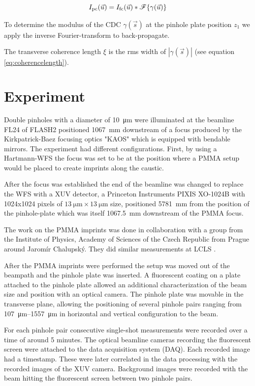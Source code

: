 \documentclass{osa-article}
\begin{document}
\begin{equation}
    I_{\textup{pc}}(\vec{u}) = I_\textup{fc}(\vec{u}) \ast \mathscr{F}\{\gamma(\vec{u})\}    
\end{equation}

To determine the modulus of the CDC $\gamma(\vec{s})$ at the pinhole plate position $z_1$ we apply the inverse Fourier-transform to back-propagate.

The transverse coherence length $\xi$ is the rms width of  $|\gamma(\vec{s})|$ (see equation \ref{eq:coherencelength}).


\section{Experiment}

Double pinholes with a diameter of \SI{10}{\micro\meter} were illuminated at the beamline FL24 of FLASH2 positioned \SI{1067}{mm} downstream of a focus produced by the Kirkpatrick-Baez focusing optics "KAOS" which is equipped with bendable mirrors. The experiment had different configurations. First, by using a Hartmann-WFS the focus was set to be at the position where a PMMA setup would be placed to create imprints along the caustic. 

After the focus was established the end of the beamline was changed to replace the WFS with a XUV detector, a Princeton Instruments PIXIS XO-1024B with 1024x1024 pixels of $\SI{13}{\micro\meter} \times \SI{13}{\micro\meter}$ size, positioned \SI{5781}{mm} from the position of the pinhole-plate which was itself \SI{1067.5}{mm} downstream of the PMMA focus.

The work on the PMMA imprints was done in collaboration with a group from the Institute of Physics, Academy of Sciences of the Czech Republic from Prague around Jarom\'{i}r Chalupsk\'{y}. They did similar measurements at LCLS \cite{Chalupsky2015PRA}.

After the PMMA imprints were performed the setup was moved out of the beampath and the pinhole plate was inserted. A fluorescent coating on a plate attached to the pinhole plate allowed an additional characterization of the beam size and position with an optical camera. The pinhole plate was movable in the transverse plane, allowing the positioning of several pinhole pairs ranging from \SIrange{107}{1557}{\um} in horizontal and vertical configuration to the beam.

For each pinhole pair consecutive single-shot measurements were recorded over a time of around 5 minutes. The optical beamline cameras recording the fluorescent screen were attached to the data acquisition system (DAQ). Each recorded image had a timestamp. These were later correlated in the data processing with the recorded images of the XUV camera. Background images were recorded with the beam hitting the fluorescent screen between two pinhole pairs.
\end{document}
